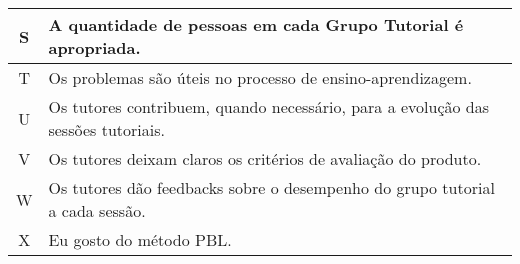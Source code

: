 \begin{table}[h]
\begin{tabular}{c|p{14.7cm}}
\hline
S & A quantidade de pessoas em cada Grupo Tutorial é apropriada.\\
\hline
T & Os problemas são úteis no processo de ensino-aprendizagem.\\
\hline
U & Os tutores contribuem, quando necessário, para a evolução das sessões tutoriais.\\
\hline
V & Os tutores deixam claros os critérios de avaliação do produto.\\
\hline
W & Os tutores dão feedbacks sobre o desempenho do grupo tutorial a cada sessão.\\
\hline
X & Eu gosto do método PBL.\\
\end{tabular}
\end{table}
